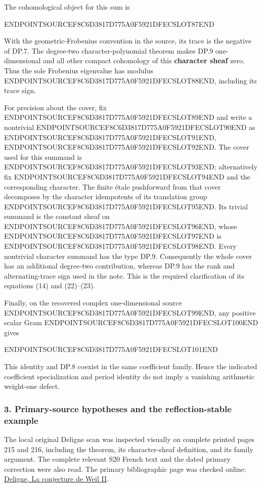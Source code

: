 The cohomological object for this sum is

ENDPOINTSOURCEF8C6D3817D775A0F5921DFECSLOT87END

With the geometric-Frobenius convention in the source, its trace is the negative of DP.7. The degree-two character-polynomial theorem makes DP.9 one-dimensional and all other compact cohomology of this \textbf{character sheaf} zero. Thus the sole Frobenius eigenvalue has modulus ENDPOINTSOURCEF8C6D3817D775A0F5921DFECSLOT88END, including its trace sign.

For precision about the cover, fix ENDPOINTSOURCEF8C6D3817D775A0F5921DFECSLOT89END and write a nontrivial ENDPOINTSOURCEF8C6D3817D775A0F5921DFECSLOT90END as ENDPOINTSOURCEF8C6D3817D775A0F5921DFECSLOT91END, ENDPOINTSOURCEF8C6D3817D775A0F5921DFECSLOT92END. The cover used for this summand is ENDPOINTSOURCEF8C6D3817D775A0F5921DFECSLOT93END; alternatively fix ENDPOINTSOURCEF8C6D3817D775A0F5921DFECSLOT94END and the corresponding character. The finite étale pushforward from that cover decomposes by the character idempotents of its translation group ENDPOINTSOURCEF8C6D3817D775A0F5921DFECSLOT95END. Its trivial summand is the constant sheaf on ENDPOINTSOURCEF8C6D3817D775A0F5921DFECSLOT96END, whose ENDPOINTSOURCEF8C6D3817D775A0F5921DFECSLOT97END is ENDPOINTSOURCEF8C6D3817D775A0F5921DFECSLOT98END. Every nontrivial character summand has the type DP.9. Consequently the whole cover has an additional degree-two contribution, whereas DP.9 has the rank and alternating-trace sign used in the note. This is the required clarification of its equations (14) and (22)--(23).

Finally, on the recovered complex one-dimensional source ENDPOINTSOURCEF8C6D3817D775A0F5921DFECSLOT99END, any positive scalar Gram ENDPOINTSOURCEF8C6D3817D775A0F5921DFECSLOT100END gives

ENDPOINTSOURCEF8C6D3817D775A0F5921DFECSLOT101END

This identity and DP.8 coexist in the same coefficient family. Hence the indicated coefficient specialization and period identity do not imply a vanishing arithmetic weight-one defect.

\subsubsection{3. Primary-source hypotheses and the reflection-stable example}\label{endpoint-purity_review--primary-source-hypotheses-and-the-reflection-stable-example}

The local original Deligne scan was inspected visually on complete printed pages 215 and 216, including the theorem, its character-sheaf definition, and its family argument. The complete relevant S20 French text and the dated primary correction were also read. The primary bibliographic page was checked online: \href{https://www.numdam.org/item/PMIHES_1980__52__137_0/}{Deligne, La conjecture de Weil II}.

